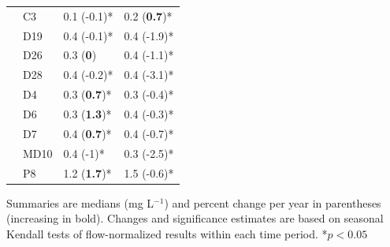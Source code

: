 \documentclass[letterpaper,12pt,oneside]{article}\usepackage[]{graphicx}\usepackage[]{color}
\begin{document}
\begin{table}[!tbp]
\begin{center}
\begin{tabular}{lll}
~~C3&0.1 \footnotesize{(-0.1)*}&0.2 \footnotesize{(\textbf{0.7})*}\tabularnewline
~~D19&0.4 \footnotesize{(-0.1)*}&0.4 \footnotesize{(-1.9)*}\tabularnewline
~~D26&0.3 \footnotesize{(\textbf{0})}&0.4 \footnotesize{(-1.1)*}\tabularnewline
~~D28&0.4 \footnotesize{(-0.2)*}&0.4 \footnotesize{(-3.1)*}\tabularnewline
~~D4&0.3 \footnotesize{(\textbf{0.7})*}&0.3 \footnotesize{(-0.4)*}\tabularnewline
~~D6&0.3 \footnotesize{(\textbf{1.3})*}&0.4 \footnotesize{(-0.3)*}\tabularnewline
~~D7&0.4 \footnotesize{(\textbf{0.7})*}&0.4 \footnotesize{(-0.7)*}\tabularnewline
~~MD10&0.4 \footnotesize{(-1)*}&0.3 \footnotesize{(-2.5)*}\tabularnewline
~~P8&1.2 \footnotesize{(\textbf{1.7})*}&1.5 \footnotesize{(-0.6)*}\tabularnewline
\hline
\end{tabular}\end{center}
\footnotesize Summaries are  medians (mg L$^{-1}$) and percent change per year in parentheses (increasing in bold). Changes and significance estimates are based on seasonal Kendall tests of flow-normalized results within each time period. *$p<0.05$\end{table}
\end{document}
